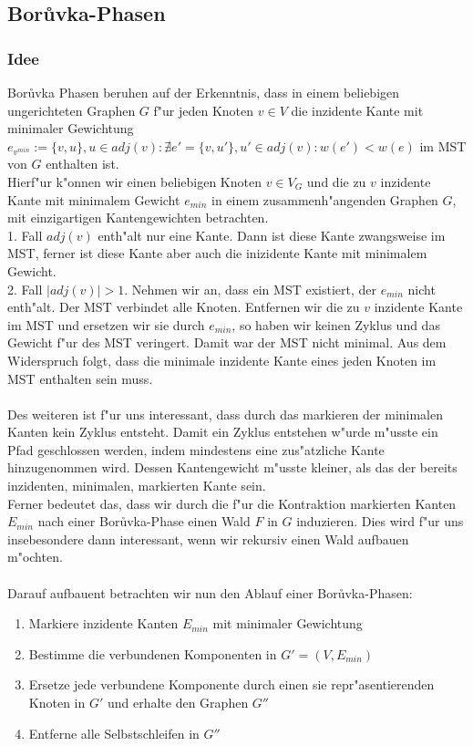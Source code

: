 \subsection{Bor\r uvka-Phasen}

\subsubsection{Idee}
\label{sec:borIdea}

Bor\r uvka Phasen beruhen auf der Erkenntnis, dass in einem beliebigen 
    ungerichteten Graphen $G$ f"ur jeden Knoten $v \in V$ die inzidente Kante mit 
    minimaler Gewichtung 
    $e_{v^{min}} := \{v, u\}, u \in adj(v): 
        \nexists e' = \{v, u'\}, u' \in adj(v): w(e') < w(e)$
    im MST von $G$ enthalten ist.\\
Hierf"ur k"onnen wir einen beliebigen Knoten $v \in V_G$ und die zu $v$ inzidente
    Kante mit minimalem Gewicht $e_{min}$ in einem 
    zusammenh"angenden Graphen $G$, mit einzigartigen Kantengewichten betrachten.\\
1. Fall $adj(v)$ enth"alt nur eine Kante. Dann ist diese Kante zwangsweise im 
    MST, ferner ist diese Kante aber auch die inizidente Kante mit minimalem
    Gewicht.\\
2. Fall $|adj(v)| > 1$. Nehmen wir an, dass ein MST existiert, der $e_{min}$ 
    nicht enth"alt. 
    Der MST verbindet alle Knoten.
    Entfernen wir die zu $v$ inzidente Kante im MST
    und ersetzen wir sie durch $e_{min}$, so haben wir keinen Zyklus und das
    Gewicht f"ur des MST veringert. 
    Damit war der MST nicht minimal.
    Aus dem Widerspruch folgt, dass die minimale inzidente Kante eines jeden
    Knoten im MST enthalten sein muss.\\
\\
Des weiteren ist f"ur uns interessant, dass durch das markieren der minimalen
    Kanten kein Zyklus entsteht. 
    Damit ein Zyklus entstehen w"urde m"usste ein Pfad geschlossen werden, 
    indem mindestens eine zus"atzliche Kante hinzugenommen wird. 
    Dessen Kantengewicht m"usste kleiner, als das der bereits inzidenten, 
    minimalen, markierten Kante sein.\\
Ferner bedeutet das, dass wir durch die f"ur die Kontraktion markierten Kanten
    $E_{min}$ nach einer Bor\r uvka-Phase einen Wald $F$ in $G$ induzieren.
    Dies wird f"ur uns insebesondere dann interessant, wenn
    wir rekursiv einen Wald aufbauen m"ochten.\\
\\
Darauf aufbauent betrachten wir nun den Ablauf einer Bor\r uvka-Phasen:
\begin{enumerate}
    \item Markiere inzidente Kanten $E_{min}$ mit minimaler Gewichtung
    \item Bestimme die verbundenen Komponenten in $G' = (V,E_{min})$
    \item Ersetze jede verbundene Komponente durch einen sie repr"asentierenden
          Knoten in $G'$ und erhalte den Graphen $G''$
    \item Entferne alle Selbstschleifen in $G''$
\end{enumerate}

